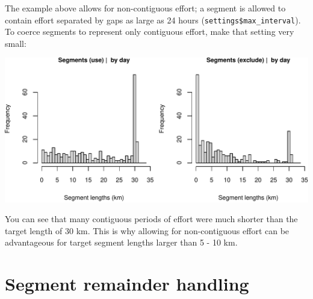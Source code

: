 \documentclass[
]{book}
\newenvironment{Shaded}{\begin{snugshade}}{\end{snugshade}}
\newcommand{\CommentTok}[1]{\textcolor[rgb]{0.56,0.35,0.01}{\textit{#1}}}
\newcommand{\DataTypeTok}[1]{\textcolor[rgb]{0.13,0.29,0.53}{#1}}
\newcommand{\DecValTok}[1]{\textcolor[rgb]{0.00,0.00,0.81}{#1}}
\newcommand{\FloatTok}[1]{\textcolor[rgb]{0.00,0.00,0.81}{#1}}
\newcommand{\KeywordTok}[1]{\textcolor[rgb]{0.13,0.29,0.53}{\textbf{#1}}}
\newcommand{\NormalTok}[1]{#1}
\newcommand{\OperatorTok}[1]{\textcolor[rgb]{0.81,0.36,0.00}{\textbf{#1}}}
\newcommand{\OtherTok}[1]{\textcolor[rgb]{0.56,0.35,0.01}{#1}}
\newcommand{\StringTok}[1]{\textcolor[rgb]{0.31,0.60,0.02}{#1}}
\begin{document}
The example above allows for non-contiguous effort; a segment is allowed to contain effort separated by gaps as large as 24 hours (\texttt{settings\$max\_interval}). To coerce segments to represent only contiguous effort, make that setting very small:

\begin{Shaded}
\end{Shaded}

\includegraphics{figures/unnamed-chunk-457-1.pdf}

You can see that many contiguous periods of effort were much shorter than the target length of 30 km. This is why allowing for non-contiguous effort can be advantageous for target segment lengths larger than 5 - 10 km.

\hypertarget{segment-remainder-handling}{%
\section*{Segment remainder handling}\label{segment-remainder-handling}}
\end{document}
